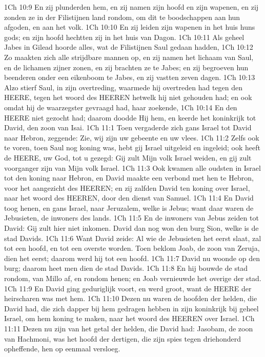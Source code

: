 1Ch 10:9  En zij plunderden hem, en zij namen zijn hoofd en zijn wapenen, en zij zonden ze in der Filistijnen land rondom, om dit te boodschappen aan hun afgoden, en aan het volk.
1Ch 10:10  En zij leiden zijn wapenen in het huis huns gods; en zijn hoofd hechtten zij in het huis van Dagon.
1Ch 10:11  Als geheel Jabes in Gilead hoorde alles, wat de Filistijnen Saul gedaan hadden,
1Ch 10:12  Zo maakten zich alle strijdbare mannen op, en zij namen het lichaam van Saul, en de lichamen zijner zonen, en zij brachten ze te Jabes; en zij begroeven hun beenderen onder een eikenboom te Jabes, en zij vastten zeven dagen.
1Ch 10:13  Alzo stierf Saul, in zijn overtreding, waarmede hij overtreden had tegen den HEERE, tegen het woord des HEEREN hetwelk hij niet gehouden had; en ook omdat hij de waarzegster gevraagd had, haar zoekende,
1Ch 10:14  En den HEERE niet gezocht had; daarom doodde Hij hem, en keerde het koninkrijk tot David, den zoon van Isai.
1Ch 11:1  Toen vergaderde zich gans Israel tot David naar Hebron, zeggende: Zie, wij zijn uw gebeente en uw vlees.
1Ch 11:2  Zelfs ook te voren, toen Saul nog koning was, hebt gij Israel uitgeleid en ingeleid; ook heeft de HEERE, uw God, tot u gezegd: Gij zult Mijn volk Israel weiden, en gij zult voorganger zijn van Mijn volk Israel.
1Ch 11:3  Ook kwamen alle oudsten in Israel tot den koning naar Hebron, en David maakte een verbond met hen te Hebron, voor het aangezicht des HEEREN; en zij zalfden David ten koning over Israel, naar het woord des HEEREN, door den dienst van Samuel.
1Ch 11:4  En David toog henen, en gans Israel, naar Jeruzalem, welke is Jebus; want daar waren de Jebusieten, de inwoners des lands.
1Ch 11:5  En de inwoners van Jebus zeiden tot David: Gij zult hier niet inkomen. David dan nog won den burg Sion, welke is de stad Davids.
1Ch 11:6  Want David zeide: Al wie de Jebusieten het eerst slaat, zal tot een hoofd, en tot een overste worden. Toen beklom Joab, de zoon van Zeruja, dien het eerst; daarom werd hij tot een hoofd.
1Ch 11:7  David nu woonde op den burg; daarom heet men dien de stad Davids.
1Ch 11:8  En hij bouwde de stad rondom, van Millo af, en rondom henen; en Joab vernieuwde het overige der stad.
1Ch 11:9  En David ging geduriglijk voort, en werd groot, want de HEERE der heirscharen was met hem.
1Ch 11:10  Dezen nu waren de hoofden der helden, die David had, die zich dapper bij hem gedragen hebben in zijn koninkrijk bij geheel Israel, om hem koning te maken, naar het woord des HEEREN over Israel.
1Ch 11:11  Dezen nu zijn van het getal der helden, die David had: Jasobam, de zoon van Hachmoni, was het hoofd der dertigen, die zijn spies tegen driehonderd opheffende, hen op eenmaal versloeg.
